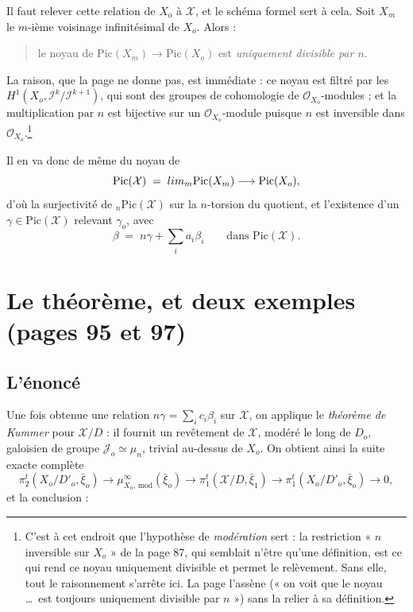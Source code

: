 \documentclass[11pt,a4paper]{article}
\begin{document}
Il faut relever cette relation de $X_{o}$ à $\mathcal{X}$, et le
schéma formel sert à cela. Soit $X_{m}$ le $m$-ième voisinage infinitésimal de
$X_{o}$. Alors :

\begin{quote}
le noyau de $\mathrm{Pic}(X_{m}) \to \mathrm{Pic}(X_{o})$ est \emph{uniquement
divisible par $n$}.
\end{quote}

La raison, que la page ne donne pas, est immédiate : ce
noyau est filtré par les $H^{1}(X_{o}, \mathcal{I}^{k}/\mathcal{I}^{k+1})$, qui
sont des groupes de cohomologie de $\mathcal{O}_{X_{o}}$-modules ; et la
multiplication par $n$ est bijective sur un $\mathcal{O}_{X_{o}}$-module
puisque $n$ est inversible dans $\mathcal{O}_{X_{o}}$.\footnote{C'est
à cet endroit que l'hypothèse de \emph{modération} sert : la restriction
« $n$ inversible sur $X_{o}$ » de la page 87, qui semblait n'être qu'une
définition, est ce qui rend ce noyau uniquement divisible et permet le
relèvement. Sans elle, tout le raisonnement s'arrête ici. La page l'assène
(« on voit que le noyau …\ est toujours uniquement divisible par $n$ »)
sans la relier à sa définition.}

Il en va donc de même du noyau de
\[
  \mathrm{Pic}(\mathcal{X}) \;=\; \varprojlim_{m} \mathrm{Pic}(X_{m})
  \longrightarrow \mathrm{Pic}(X_{o}) ,
\]
d'où la surjectivité de ${}_{n}\mathrm{Pic}(\mathcal{X})$ sur la $n$-torsion du
quotient, et l'existence d'un $\gamma \in \mathrm{Pic}(\mathcal{X})$ relevant
$\gamma_{o}$, avec
\[
  \beta \;=\; n\gamma + \sum_{i} a_{i}\beta_{i}
  \qquad \text{dans } \mathrm{Pic}(\mathcal{X}) .
\]

\section*{Le théorème, et deux exemples (pages 95 et 97)}

\subsection*{L'énoncé}

Une fois obtenue une relation $n\gamma = \sum_{i} c_{i}\beta_{i}$ sur
$\mathcal{X}$, on applique le \emph{théorème de Kummer} pour $\mathcal{X}/D$ :
il fournit un revêtement de $\mathcal{X}$, modéré le long de $D_{o}$, galoisien
de groupe $\mathcal{J}_{o} \simeq \mu_{n}$, trivial au-dessus de $X_{o}$. On
obtient ainsi la suite exacte complète
\[
  \pi_{2}^{t}(X_{o}/D'_{o}, \bar{\xi}_{o}) \to
  \mu^{\infty}_{X_{o},\,\mathrm{mod}}(\bar{\xi}_{o}) \to
  \pi_{1}^{t}(\mathcal{X}/D, \bar{\xi}_{1}) \to
  \pi_{1}^{t}(X_{o}/D'_{o}, \bar{\xi}_{o}) \to 0 ,
\]
et la conclusion :
\end{document}
